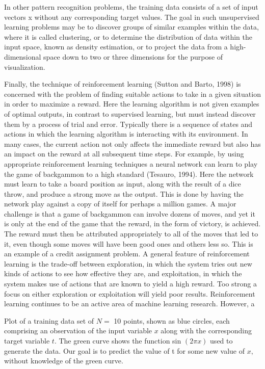 \documentclass[
  10
]{article}
\begin{document}
In other pattern recognition problems, the training data consists of a
set of input vectors x without any corresponding target values. The goal
in such unsupervised learning problems may be to discover groups of
similar examples within the data, where it is called clustering, or to
determine the distribution of data within the input space, known as
density estimation, or to project the data from a high-dimensional space
down to two or three dimensions for the purpose of visualization.

Finally, the technique of reinforcement learning (Sutton and Barto,
1998) is concerned with the problem of finding suitable actions to take
in a given situation in order to maximize a reward. Here the learning
algorithm is not given examples of optimal outputs, in contrast to
supervised learning, but must instead discover them by a process of
trial and error. Typically there is a sequence of states and actions in
which the learning algorithm is interacting with its environment. In
many cases, the current action not only affects the immediate reward but
also has an impact on the reward at all subsequent time steps. For
example, by using appropriate reinforcement learning techniques a neural
network can learn to play the game of backgammon to a high standard
(Tesauro, 1994). Here the network must learn to take a board position as
input, along with the result of a dice throw, and produce a strong move
as the output. This is done by having the network play against a copy of
itself for perhaps a million games. A major challenge is that a game of
backgammon can involve dozens of moves, and yet it is only at the end of
the game that the reward, in the form of victory, is achieved. The
reward must then be attributed appropriately to all of the moves that
led to it, even though some moves will have been good ones and others
less so. This is an example of a credit assignment problem. A general
feature of reinforcement learning is the trade-off between exploration,
in which the system tries out new kinds of actions to see how effective
they are, and exploitation, in which the system makes use of actions
that are known to yield a high reward. Too strong a focus on either
exploration or exploitation will yield poor results. Reinforcement
learning continues to be an active area of machine learning research.
However, a

Plot of a training data set of \(N =\) 10 points, shown as blue circles,
each comprising an observation of the input variable \(x\) along with
the corresponding target variable \(t .\) The green curve shows the
function sin \(( 2 \pi x )\) used to generate the data. Our goal is to
predict the value of t for some new value of \(x ,\) without knowledge
of the green curve.
\end{document}
